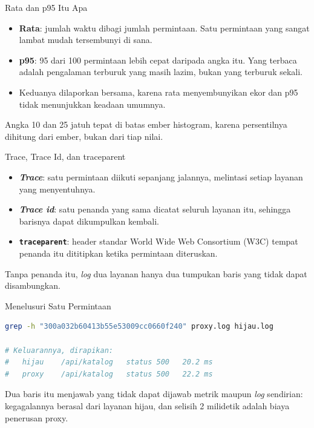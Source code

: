 \documentclass[aspectratio=169, table, 12pt]{beamer}
\begin{document}
\begin{frame}{{\Large Rata dan p95 Itu Apa}}
  \vspace{10pt}
  \begin{itemize}
    \item \textbf{Rata}: jumlah waktu dibagi jumlah permintaan. Satu
          permintaan yang sangat lambat mudah tersembunyi di sana.
    \item \textbf{p95}: 95 dari 100 permintaan lebih cepat daripada angka
          itu. Yang terbaca adalah pengalaman terburuk yang masih lazim,
          bukan yang terburuk sekali.
    \item Keduanya dilaporkan bersama, karena rata menyembunyikan ekor dan
          p95 tidak menunjukkan keadaan umumnya.
  \end{itemize}
  \vspace{8pt}
  {\small Angka 10 dan 25 jatuh tepat di batas ember histogram, karena
  persentilnya dihitung dari ember, bukan dari tiap nilai.}
\end{frame}

\begin{frame}{{\Large Trace, Trace Id, dan traceparent}}
  \vspace{10pt}
  \begin{itemize}
    \item \textbf{\textit{Trace}}: satu permintaan diikuti sepanjang
          jalannya, melintasi setiap layanan yang menyentuhnya.
    \item \textbf{\textit{Trace id}}: satu penanda yang sama dicatat
          seluruh layanan itu, sehingga barisnya dapat dikumpulkan kembali.
    \item \textbf{\texttt{traceparent}}: header standar World Wide Web
          Consortium (W3C) tempat penanda itu dititipkan ketika permintaan
          diteruskan.
  \end{itemize}
  \vspace{8pt}
  {\small Tanpa penanda itu, \textit{log} dua layanan hanya dua tumpukan
  baris yang tidak dapat disambungkan.}
\end{frame}

\begin{frame}[fragile]{{\Large Menelusuri Satu Permintaan}}
  \vspace{2pt}
\begin{lstlisting}[language=bash]
grep -h "300a032b60413b55e53009cc0660f240" proxy.log hijau.log

# Keluarannya, dirapikan:
#   hijau    /api/katalog   status 500   20.2 ms
#   proxy    /api/katalog   status 500   22.2 ms
\end{lstlisting}
  \vspace{4pt}
  {\small Dua baris itu menjawab yang tidak dapat dijawab metrik maupun
  \textit{log} sendirian: kegagalannya berasal dari layanan hijau, dan
  selisih 2 milidetik adalah biaya penerusan proxy.}
\end{frame}
\end{document}
